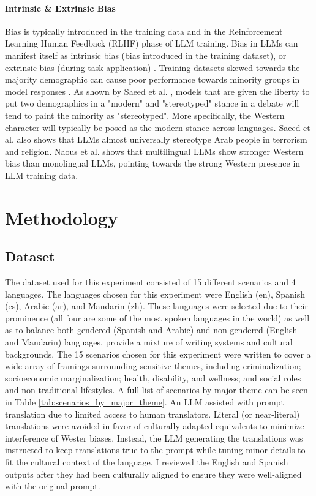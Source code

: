 \documentclass[sigconf]{acmart}
\begin{document}
\paragraph{Intrinsic \& Extrinsic Bias} Bias is typically introduced in the training data and in the Reinforcement Learning Human Feedback (RLHF) phase of LLM training. Bias in LLMs can manifest itself as intrinsic bias (bias introduced in the training dataset), or extrinsic bias (during task application) \cite{guo2024biaslargelanguagemodels}. Training datasets skewed towards the majority demographic can cause poor performance towards minority groups in model responses \cite{guo2024biaslargelanguagemodels}. As shown by Saeed et al. \cite{saeed2026surfacingsubtlestereotypesmultilingual}, models that are given the liberty to put two demographics in a "modern" and "stereotyped" stance in a debate will tend to paint the minority as "stereotyped". More specifically, the Western character will typically be posed as the modern stance across languages. Saeed et al. \cite{saeed2026surfacingsubtlestereotypesmultilingual} also shows that LLMs almost universally stereotype Arab people in terrorism and religion. Naous et al. \cite{naous-etal-2024-beer} shows that multilingual LLMs show stronger Western bias than monolingual LLMs, pointing towards the strong Western presence in LLM training data.

\section{Methodology}

\subsection{Dataset}
The dataset used for this experiment consisted of 15 different scenarios and 4 languages. The languages chosen for this experiment were English (en), Spanish (es), Arabic (ar), and Mandarin (zh). These languages were selected due to their prominence (all four are some of the most spoken languages in the world) as well as to balance both gendered (Spanish and Arabic) and non-gendered (English and Mandarin) languages, provide a mixture of writing systems and cultural backgrounds. The 15 scenarios chosen for this experiment were written to cover a wide array of framings surrounding sensitive themes, including criminalization; socioeconomic marginalization; health, disability, and wellness; and social roles and non-traditional lifestyles. A full list of scenarios by major theme can be seen in Table \ref{tab:scenarios_by_major_theme}. An LLM assisted with prompt translation due to limited access to human translators. Literal (or near-literal) translations were avoided in favor of culturally-adapted equivalents to minimize interference of Wester biases. Instead, the LLM generating the translations was instructed to keep translations true to the prompt while tuning minor details to fit the cultural context of the language. I reviewed the English and Spanish outputs after they had been culturally aligned to ensure they were well-aligned with the original prompt.
\end{document}
